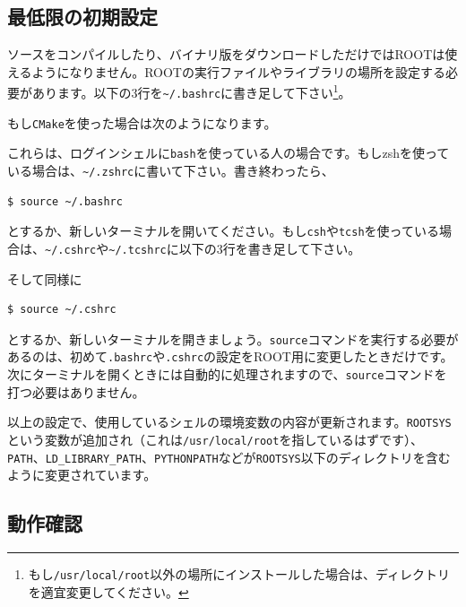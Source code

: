 \subsection{最低限の初期設定}
\label{subsec_settings}
ソースをコンパイルしたり、バイナリ版をダウンロードしただけではROOTは使えるようになりません。ROOTの実行ファイルやライブラリの場所を設定する必要があります。以下の3行を\texttt{\~{}/.bashrc}に書き足して下さい\footnote{もし\texttt{/usr/local/root}以外の場所にインストールした場合は、ディレクトリを適宜変更してください。}。
\begin{NoFloat}

\end{NoFloat}
もし\texttt{CMake}を使った場合は次のようになります。
\begin{NoFloat}

\end{NoFloat}

これらは、ログインシェルに\texttt{bash}を使っている人の場合です。もしzshを使っている場合は、\texttt{\~{}/.zshrc}に書いて下さい。書き終わったら、
\begin{lstlisting}[language=bash]
$ source ~/.bashrc
\end{lstlisting}
とするか、新しいターミナルを開いてください。もし\texttt{csh}や\texttt{tcsh}を使っている場合は、\texttt{\~{}/.cshrc}や\texttt{\~{}/.tcshrc}に以下の3行を書き足して下さい。
\begin{NoFloat}

\end{NoFloat}
そして同様に
\begin{lstlisting}[language=bash]
$ source ~/.cshrc
\end{lstlisting}
とするか、新しいターミナルを開きましょう。\texttt{source}コマンドを実行する必要があるのは、初めて\texttt{.bashrc}や\texttt{.cshrc}の設定をROOT用に変更したときだけです。次にターミナルを開くときには自動的に処理されますので、\texttt{source}コマンドを打つ必要はありません。

以上の設定で、使用しているシェルの環境変数の内容が更新されます。\texttt{ROOTSYS}という変数が追加され（これは\texttt{/usr/local/root}を指しているはずです）、\texttt{PATH}、\texttt{LD\_LIBRARY\_PATH}、\texttt{PYTHONPATH}などが\texttt{ROOTSYS}以下のディレクトリを含むように変更されています。

\subsection{動作確認}

